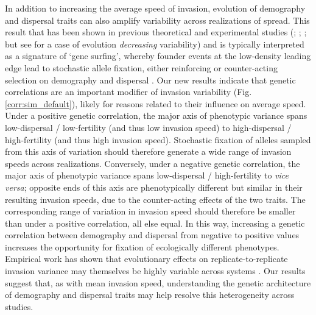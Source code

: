 \documentclass[11pt]{article}
\begin{document}
In addition to increasing the average speed of invasion, evolution of demography and dispersal traits can also amplify variability across realizations of spread.
This result that has been shown in previous theoretical and experimental studies (\citealt{ochocki_rapid_2017}; \citealt{weiss-lehman_rapid_2017}; \citealt{phillips_evolutionary_2015}; but see \citealt{williams_rapid_2016} for a case of evolution \textit{decreasing} variability) and is typically interpreted as a signature of `gene surfing', whereby founder events at the low-density leading edge lead to stochastic allele fixation, either reinforcing or counter-acting selection on demography and dispersal \citep{edmonds_mutations_2004,klopfstein_fate_2006,excoffier_surfing_2008,peischl_expansion_2015}.
Our new results indicate that genetic correlations are an important modifier of invasion variability (Fig. \ref{corr:sim_default}), likely for reasons related to their influence on average speed.
Under a positive genetic correlation, the major axis of phenotypic variance spans low-dispersal / low-fertility (and thus low invasion speed) to high-dispersal / high-fertility (and thus high invasion speed).
Stochastic fixation of alleles sampled from this axis of variation should therefore generate a wide range of invasion speeds across realizations.
Conversely, under a negative genetic correlation, the major axis of phenotypic variance spans low-dispersal / high-fertility to \textit{vice versa}; opposite ends of this axis are phenotypically different but similar in their resulting invasion speeds, due to the counter-acting effects of the two traits.
The corresponding range of variation in invasion speed should therefore be smaller than under a positive correlation, all else equal.
In this way, increasing a genetic correlation between demography and dispersal from negative to positive values increases the opportunity for fixation of ecologically different phenotypes.
Empirical work has shown that evolutionary effects on replicate-to-replicate invasion variance may themselves be highly variable across systems \citep{ochocki_rapid_2017,weiss-lehman_rapid_2017,williams_rapid_2016,van2018kin}.
Our results suggest that, as with mean invasion speed, understanding the genetic architecture of demography and dispersal traits may help resolve this heterogeneity across studies.
\end{document}

